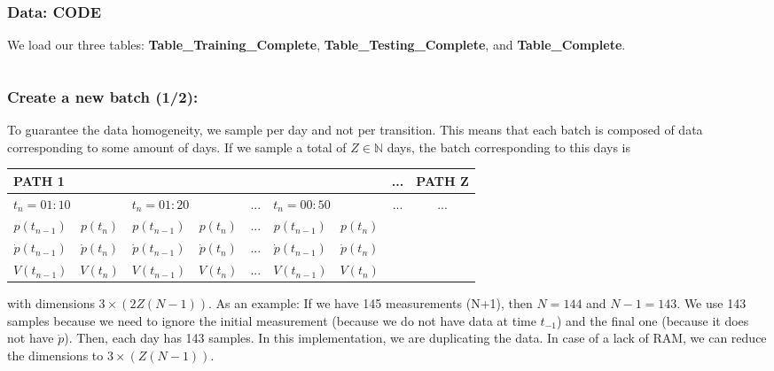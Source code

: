 \documentclass[aspectratio=169]{beamer}\usepackage[utf8]{inputenc}
\newcommand{\N}{\mathbb{N}}
\begin{document}
\begin{frame}\frametitle{Data: CODE}

We load our three tables: \textbf{Table\_Training\_Complete}, \textbf{Table\_Testing\_Complete}, and \textbf{Table\_Complete}.

\begin{center}
\begin{tabular}{|c|}
\toprule
{\tiny

}\\
\bottomrule
\end{tabular}
\end{center}

\end{frame}


\begin{frame}\frametitle{Create a new batch (1/2):} \label{cre_batch}

To guarantee the data homogeneity, we sample per day and not per transition. This means that each batch is composed of data corresponding to some amount of days. If we sample a total of $Z\in\N$ days, the batch corresponding to this days is
\begin{table}[]
\begin{tabular}{|c|c|c|c|c|c|c|c|c|}
\hline
\multicolumn{7}{|l|}{PATH 1}                                                                                       & ...                  & PATH Z               \\ \hline
\multicolumn{2}{|l|}{$t_n=01:10$}   & \multicolumn{2}{l|}{$t_n=01:20$}    & ... & \multicolumn{2}{l|}{$t_n=00:50$} & \multirow{4}{*}{...} & \multirow{4}{*}{...} \\ \cline{1-7}
$p(t_{n-1})$      & $p(t_{n})$      & $p(t_{n-1})$      & $p(t_{n})$      & ... & $p(t_{n-1})$     & $p(t_{n})$    &                      &                      \\ \cline{1-7}
$\dot{p}(t_{n-1})$ & $\dot{p}(t_{n})$ & $\dot{p}(t_{n-1})$ & $\dot{p}(t_{n})$ & ... & $\dot{p}(t_{n-1})$     & $\dot{p}(t_{n})$    &                      &                      \\ \cline{1-7}

$V(t_{n-1})$      & $V(t_{n})$      & $V(t_{n-1})$      & $V(t_{n})$      & ... & $V(t_{n-1})$     & $V(t_{n})$    &                      &                      \\ \hline
\end{tabular}
\end{table}
with dimensions $3\times(2Z(N-1))$. As an example: If we have 145 measurements (N+1), then $N=144$ and $N-1=143$. We use 143 samples because we need to ignore the initial measurement (because we do not have data at time $t_{-1}$) and the final one (because it does not have $\dot{p}$). Then, each day has 143 samples. In this implementation, we are duplicating the data. In case of a lack of RAM, we can reduce the dimensions to $3\times(Z(N-1))$.
\end{frame}
\end{document}
